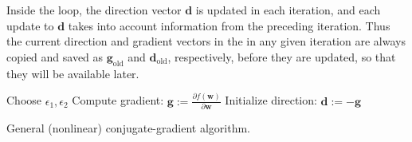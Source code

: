 Inside the loop, the direction vector $\textbf{d}$ is updated in each iteration, and each update to  $\textbf{d}$ 
takes into account information from the preceding iteration. Thus the current direction and gradient vectors in the in any given iteration are always copied and saved as $\textbf{g}_ {\text{old}}$ and $\textbf{d}_{\text{old}}$, respectively, before they are updated, so that they will be available later.
\begin{algorithm}[h]
 Choose $\epsilon_1, \epsilon_2$\;
 Compute gradient: $\textbf{g} := \frac{\partial f(\textbf{w})}{\partial \textbf{w}}$\;
Initialize direction: $\textbf{d} := -\textbf{g}$\; \label{line:init-d}
\caption{General (nonlinear) conjugate-gradient algorithm. }
\label{alg:gen-cg}
\end{algorithm}



